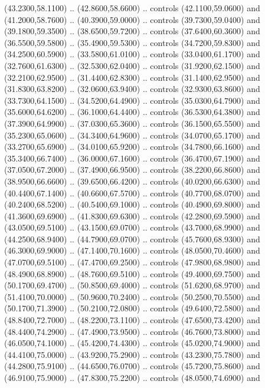 {\begin{scope}[y=0.80pt, x=0.80pt, yscale=-1, xscale=1, inner sep=0pt, outer sep=0pt, #1]
      (43.2300,58.1100) .. (42.8600,58.6600) .. controls (42.1100,59.0600) and
      (41.2000,58.7600) .. (40.3900,59.0000) .. controls (39.7300,59.0400) and
      (39.1800,59.3500) .. (38.6500,59.7200) .. controls (37.6400,60.3600) and
      (36.5500,59.5800) .. (35.4900,59.5300) .. controls (34.7200,59.8300) and
      (34.2500,60.5900) .. (33.5800,61.0100) .. controls (33.0400,61.1700) and
      (32.7600,61.6300) .. (32.5300,62.0400) .. controls (31.9200,62.1500) and
      (32.2100,62.9500) .. (31.4400,62.8300) .. controls (31.1400,62.9500) and
      (31.8300,63.8200) .. (32.0600,63.9400) .. controls (32.9300,63.8600) and
      (33.7300,64.1500) .. (34.5200,64.4900) .. controls (35.0300,64.7900) and
      (35.6000,64.6200) .. (36.1000,64.4400) .. controls (36.5300,64.3800) and
      (37.3900,64.9900) .. (37.0300,65.3600) .. controls (36.1500,65.5500) and
      (35.2300,65.0600) .. (34.3400,64.9600) .. controls (34.0700,65.1700) and
      (33.2700,65.6900) .. (34.0100,65.9200) .. controls (34.7800,66.1600) and
      (35.3400,66.7400) .. (36.0000,67.1600) .. controls (36.4700,67.1900) and
      (37.0500,67.2000) .. (37.4900,66.9500) .. controls (38.2200,66.8600) and
      (38.9500,66.6600) .. (39.6500,66.4200) .. controls (40.0200,66.6300) and
      (40.4400,67.1400) .. (40.6600,67.5700) .. controls (40.7700,68.0700) and
      (40.2400,68.5200) .. (40.5400,69.1000) .. controls (40.4900,69.8000) and
      (41.3600,69.6900) .. (41.8300,69.6300) .. controls (42.2800,69.5900) and
      (43.0500,69.5100) .. (43.1500,69.0700) .. controls (43.7000,68.9900) and
      (44.2500,68.9400) .. (44.7900,69.0700) .. controls (45.7600,68.9300) and
      (46.3000,69.9000) .. (47.1400,70.1600) .. controls (48.0500,70.4600) and
      (47.0700,69.5100) .. (47.4700,69.2500) .. controls (47.9800,68.9800) and
      (48.4900,68.8900) .. (48.7600,69.5100) .. controls (49.4000,69.7500) and
      (50.1700,69.4700) .. (50.8500,69.4000) .. controls (51.6200,68.9700) and
      (51.4100,70.0000) .. (50.9600,70.2400) .. controls (50.2500,70.5500) and
      (50.1700,71.3900) .. (50.2100,72.0800) .. controls (49.6400,72.5800) and
      (48.8400,72.7000) .. (48.2200,73.1100) .. controls (47.6500,73.4200) and
      (48.4400,74.2900) .. (47.4900,73.9500) .. controls (46.7600,73.8000) and
      (46.0500,74.1000) .. (45.4200,74.4300) .. controls (45.0200,74.9000) and
      (44.4100,75.0000) .. (43.9200,75.2900) .. controls (43.2300,75.7800) and
      (44.2800,75.9100) .. (44.6500,76.0700) .. controls (45.7200,75.8600) and
      (46.9100,75.9000) .. (47.8300,75.2200) .. controls (48.0500,74.6900) and

\end{scope}}
